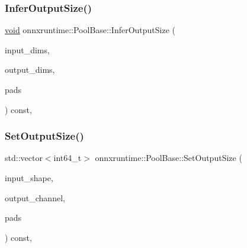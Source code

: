 \mbox{\label{classonnxruntime_1_1PoolBase_ab49048558a89a492f93cc36f5e7ab599}} 
\subsubsection{\texorpdfstring{Infer\+Output\+Size()}{InferOutputSize()}}
{\footnotesize\ttfamily \mbox{\hyperlink{mlasi_8h_a88f941d423cb2a819b70a1358982b1a6}{void}} onnxruntime\+::\+Pool\+Base\+::\+Infer\+Output\+Size (\begin{DoxyParamCaption}\item[{const std\+::vector$<$ int64\+\_\+t $>$ \&}]{input\+\_\+dims,  }\item[{std\+::vector$<$ int64\+\_\+t $>$ $\ast$}]{output\+\_\+dims,  }\item[{std\+::vector$<$ int64\+\_\+t $>$ $\ast$}]{pads }\end{DoxyParamCaption}) const\hspace{0.3cm}{\ttfamily [inline]}, {\ttfamily [protected]}}

\mbox{\label{classonnxruntime_1_1PoolBase_aa29f1684c5e53beece327006e1e8f9e7}} 
\subsubsection{\texorpdfstring{Set\+Output\+Size()}{SetOutputSize()}}
{\footnotesize\ttfamily std\+::vector$<$int64\+\_\+t$>$ onnxruntime\+::\+Pool\+Base\+::\+Set\+Output\+Size (\begin{DoxyParamCaption}\item[{const \mbox{\hyperlink{classonnxruntime_1_1TensorShape}{Tensor\+Shape}} \&}]{input\+\_\+shape,  }\item[{int64\+\_\+t}]{output\+\_\+channel,  }\item[{std\+::vector$<$ int64\+\_\+t $>$ $\ast$}]{pads }\end{DoxyParamCaption}) const\hspace{0.3cm}{\ttfamily [inline]}, {\ttfamily [protected]}}

